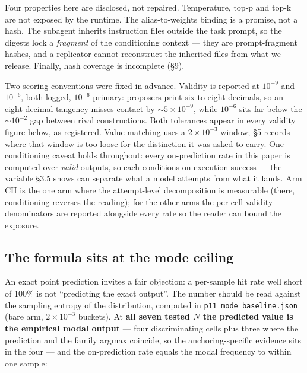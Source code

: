 Four properties here are disclosed, not repaired. Temperature, top-p and top-k are not exposed
by the runtime. The alias-to-weights binding is a promise, not a hash. The subagent inherits
instruction files outside the task prompt, so the digests lock a \emph{fragment} of the conditioning
context --- they are prompt-fragment hashes, and a replicator cannot reconstruct the inherited
files from what we release. Finally, hash coverage is incomplete (\S9).

Two scoring conventions were fixed in advance. Validity is reported at $10^{-9}$ and $10^{-6}$, both
logged, $10^{-6}$ primary: proposers print six to eight decimals, so an eight-decimal tangency misses
contact by $\sim$$5\times10^{-9}$, while $10^{-6}$ sits far below the $\sim$$10^{-2}$ gap between rival constructions. Both
tolerances appear in every validity figure below, as registered. Value matching uses a $2\times10^{-3}$
window; \S5 records where that window is too loose for the distinction it was asked to carry.
One conditioning caveat holds throughout: every on-prediction rate in this paper is computed over
\emph{valid} outputs, so each conditions on execution success --- the variable \S3.5 shows can
separate what a model attempts from what it lands. Arm CH is the one arm where the attempt-level
decomposition is measurable (there, conditioning reverses the reading); for the other arms the
per-cell validity denominators are reported alongside every rate so the reader can bound the
exposure.

\subsection{The formula sits at the mode ceiling}

An exact point prediction invites a fair objection: a per-sample hit rate well short of 100\% is
not ``predicting the exact output''. The number should be read against the sampling entropy of the distribution, computed in
\texttt{p11\_mode\_baseline.json} (bare arm, $2\times10^{-3}$ buckets). At \textbf{all seven tested $N$ the predicted
value is the empirical modal output} --- four discriminating cells plus three where the
prediction and the family argmax coincide, so the anchoring-specific evidence sits in the
four --- and the on-prediction rate equals the modal frequency to
within one sample:

